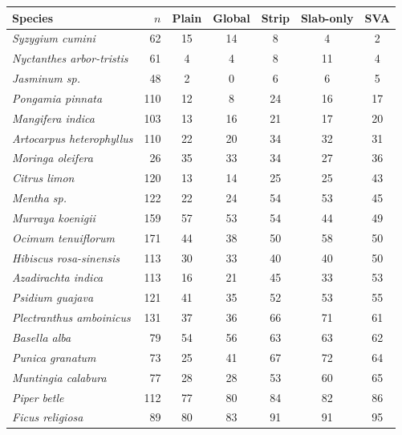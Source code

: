 \begin{tabular}{lrccccc}
\toprule
Species & $n$ & Plain & Global & Strip & Slab-only & SVA \\
\midrule
\textit{Syzygium cumini} & 62 & 15 & 14 & 8 & 4 & 2 \\
\textit{Nyctanthes arbor-tristis} & 61 & 4 & 4 & 8 & 11 & 4 \\
\textit{Jasminum sp.} & 48 & 2 & 0 & 6 & 6 & 5 \\
\textit{Pongamia pinnata} & 110 & 12 & 8 & 24 & 16 & 17 \\
\textit{Mangifera indica} & 103 & 13 & 16 & 21 & 17 & 20 \\
\textit{Artocarpus heterophyllus} & 110 & 22 & 20 & 34 & 32 & 31 \\
\textit{Moringa oleifera} & 26 & 35 & 33 & 34 & 27 & 36 \\
\textit{Citrus limon} & 120 & 13 & 14 & 25 & 25 & 43 \\
\textit{Mentha sp.} & 122 & 22 & 24 & 54 & 53 & 45 \\
\textit{Murraya koenigii} & 159 & 57 & 53 & 54 & 44 & 49 \\
\textit{Ocimum tenuiflorum} & 171 & 44 & 38 & 50 & 58 & 50 \\
\textit{Hibiscus rosa-sinensis} & 113 & 30 & 33 & 40 & 40 & 50 \\
\textit{Azadirachta indica} & 113 & 16 & 21 & 45 & 33 & 53 \\
\textit{Psidium guajava} & 121 & 41 & 35 & 52 & 53 & 55 \\
\textit{Plectranthus amboinicus} & 131 & 37 & 36 & 66 & 71 & 61 \\
\textit{Basella alba} & 79 & 54 & 56 & 63 & 63 & 62 \\
\textit{Punica granatum} & 73 & 25 & 41 & 67 & 72 & 64 \\
\textit{Muntingia calabura} & 77 & 28 & 28 & 53 & 60 & 65 \\
\textit{Piper betle} & 112 & 77 & 80 & 84 & 82 & 86 \\
\textit{Ficus religiosa} & 89 & 80 & 83 & 91 & 91 & 95 \\
\bottomrule
\end{tabular}